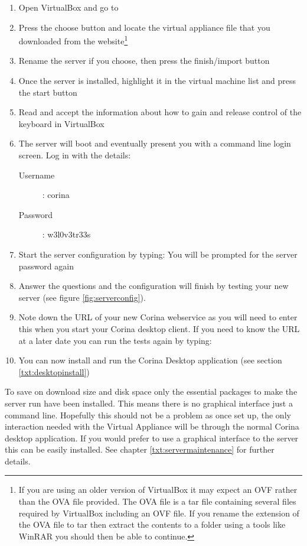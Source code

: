 \begin{enumerate}
 \item Open VirtualBox and go to 
 \item Press the choose button and locate the virtual appliance file that you downloaded from the website\footnote{If you are using an older version of VirtualBox it may expect an OVF rather than the OVA file provided.  The OVA file is a tar file containing several files required by VirtualBox including an OVF file.  If you rename the extension of the OVA file to tar then extract the contents to a folder using a tools like WinRAR you should then be able to continue.}
 \item Rename the server if you choose, then press the finish/import button
 \item Once the server is installed, highlight it in the virtual machine list and press the start button
 \item Read and accept the information about how to gain and release control of the keyboard in VirtualBox
 \item The server will boot and eventually present you with a command line login screen.  Log in with the details:
    \begin{description}
      \item[Username] : corina
      \item[Password] : w3l0v3tr33s
    \end{description}
 \item Start the server configuration by typing:  You will be prompted for the server password again
 \item Answer the questions and the configuration will finish by testing your new server (see figure \ref{fig:serverconfig}). 
 \item Note down the URL of your new Corina webservice as you will need to enter this when you start your Corina desktop client.  If you need to know the URL at a later date you can run the tests again by typing: 
 \item You can now install and run the Corina Desktop application (see section \ref{txt:desktopinstall})
\end{enumerate}

To save on download size and disk space only the essential packages to make the server run have been installed.  This means there is no graphical interface just a command line.  Hopefully this should not be a problem as once set up, the only interaction needed with the Virtual Appliance will be through the normal Corina desktop application.  If you would prefer to use a graphical interface to the server this can be easily installed.  See chapter \ref{txt:servermaintenance} for further details.


